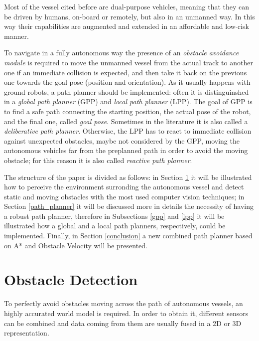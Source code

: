 \documentclass[12pt]{article}
\begin{document}
      \indent Most of the vessel cited before are dual-purpose vehicles, meaning that they can be driven by humans, on-board or remotely, but also in an unmanned way. In this way their capabilities are augmented and extended in an affordable and low-risk manner.

      \indent To navigate in a fully autonomous way the presence of an \textit{obstacle avoidance module} is required to move the unmanned vessel from the actual track to another one if an immediate collision is expected, and then take it back on the previous one towards the goal pose (position and orientation). As it usually happens with ground robots, a path planner should be implemented: often it is distinguinshed in a \textit{global path planner} (GPP) and \textit{local path planner} (LPP). The goal of GPP is to find a safe path connecting the starting position, the actual pose of the robot, and the final one, called \textit{goal pose}. Sometimes in the literature it is also called a \textit{deliberative path planner}. Otherwise, the LPP has to react to immediate collision against unexpected obstacles, maybe not considered by the GPP, moving the autonomous vehicles far from the preplanned path in order to avoid the moving obstacle; for this reason it is also called \textit{reactive path planner}.

      \indent The structure of the paper is divided as follows: in Section \ref{obs_det} it will be illustrated how to perceive the environment surronding the autonomous vessel and detect static and moving obstacles with the most used computer vision techniques; in Section \ref{path_planner} it will be discussed more in details the necessity of having a robust path planner, therefore in Subsections \ref{gpp} and \ref{lpp} it will be illustrated how a global and a local path planners, respectively, could be implemented. Finally, in Section \ref{conclusion} a new combined path planner based on A* and Obstacle Velocity will be presented.


\section{Obstacle Detection} \label{obs_det}

      \indent To perfectly avoid obstacles moving across the path of autonomous vessels, an highly accurated world model is required. In order to obtain it, different sensors can be combined and data coming from them are usually fused in a 2D or 3D representation.
\end{document}
